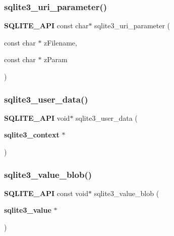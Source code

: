 \mbox{\label{sqlite3_8h_a5475bac2ab568ef8fe90e608bbf02ccf}} 
\subsubsection{sqlite3\_uri\_parameter()}
{\footnotesize\ttfamily \textbf{ S\+Q\+L\+I\+T\+E\+\_\+\+A\+PI} const char$\ast$ sqlite3\+\_\+uri\+\_\+parameter (\begin{DoxyParamCaption}\item[{const char $\ast$}]{z\+Filename,  }\item[{const char $\ast$}]{z\+Param }\end{DoxyParamCaption})}

\mbox{\label{sqlite3_8h_a106746c9a58ec015ea49245a52701891}} 
\subsubsection{sqlite3\_user\_data()}
{\footnotesize\ttfamily \textbf{ S\+Q\+L\+I\+T\+E\+\_\+\+A\+PI} void$\ast$ sqlite3\+\_\+user\+\_\+data (\begin{DoxyParamCaption}\item[{\textbf{ sqlite3\+\_\+context} $\ast$}]{ }\end{DoxyParamCaption})}

\mbox{\label{sqlite3_8h_ad1fe791079db4f1e36cabe30f66b0ad5}} 
\subsubsection{sqlite3\_value\_blob()}
{\footnotesize\ttfamily \textbf{ S\+Q\+L\+I\+T\+E\+\_\+\+A\+PI} const void$\ast$ sqlite3\+\_\+value\+\_\+blob (\begin{DoxyParamCaption}\item[{\textbf{ sqlite3\+\_\+value} $\ast$}]{ }\end{DoxyParamCaption})}

\mbox{\label{sqlite3_8h_aee6da873358a81b4bbbe1284f157b146}} 
